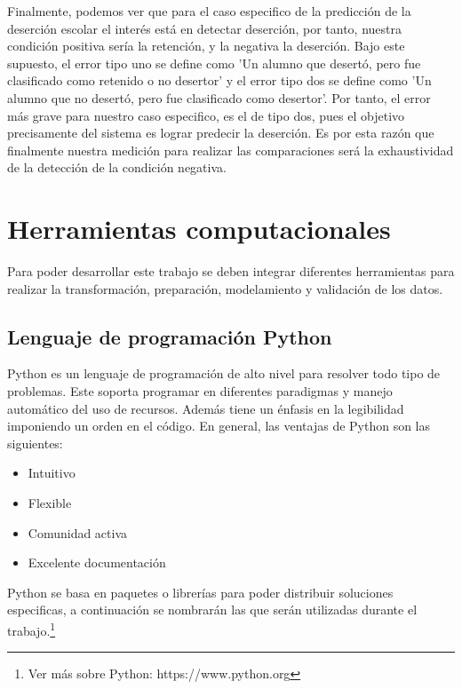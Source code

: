 Finalmente, podemos ver que para el caso especifico de la predicción de la deserción escolar el interés está en detectar deserción, por tanto, nuestra condición positiva sería la retención, y la negativa la deserción. Bajo este supuesto, el error tipo uno se define como 'Un alumno que desertó, pero fue clasificado como retenido o no desertor' y el error tipo dos se define como 'Un alumno que no desertó, pero fue clasificado como desertor'. Por tanto, el error más grave para nuestro caso especifico, es el de tipo dos, pues el objetivo precisamente del sistema es lograr predecir la deserción. Es por esta razón que finalmente nuestra medición para realizar las comparaciones será la exhaustividad de la detección de la condición negativa.

\section{Herramientas computacionales}
Para poder desarrollar este trabajo se deben integrar diferentes herramientas para realizar la transformación, preparación, modelamiento y validación de los datos.
\subsection{Lenguaje de programación Python}
Python es un lenguaje de programación de alto nivel para resolver todo tipo de problemas. Este soporta programar en diferentes paradigmas y manejo automático del uso de recursos. Además tiene un énfasis en la legibilidad imponiendo un orden en el código.
En general, las ventajas de Python son las siguientes:
\begin{itemize}
  \item Intuitivo
  \item Flexible
  \item Comunidad activa
  \item Excelente documentación
\end{itemize}
Python se basa en paquetes o librerías para poder distribuir soluciones especificas, a continuación se nombrarán las que serán utilizadas durante el trabajo.\footnote{Ver más sobre Python: https://www.python.org}
